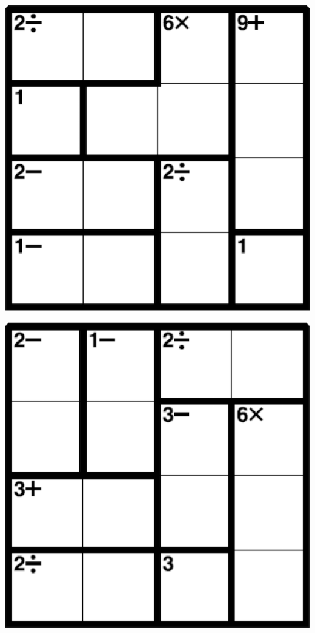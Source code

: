 
\includegraphics[scale=1]{Gambar/Lampiran/4x4_37.png}

\includegraphics[scale=1]{Gambar/Lampiran/4x4_38.png}

